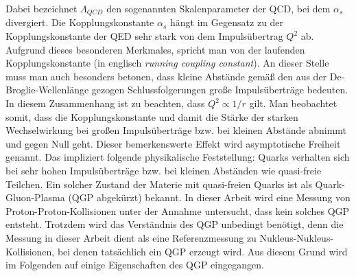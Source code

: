 \documentclass[12pt,a4paper]{report}
\begin{document}
Dabei bezeichnet $\Lambda_{QCD}$ den sogenannten Skalenparameter der QCD, bei dem $\alpha_{s}$ divergiert. Die Kopplungskonstante $\alpha_{s}$ hängt im Gegensatz zu der Kopplungskonstante der QED sehr stark von dem Impulsübertrag $Q^{2}$ ab. Aufgrund dieses besonderen Merkmales, spricht man von der laufenden Kopplungskonstante (in englisch \textit{running coupling constant}). An dieser Stelle muss man auch besonders betonen, dass kleine Abstände gemäß den aus der De-Broglie-Wellenlänge gezogen Schlussfolgerungen große Impulsüberträge bedeuten. In diesem Zusammenhang ist zu beachten, dass $Q^{2}\propto 1/r$ gilt. Man beobachtet somit, dass die Kopplungskonstante und damit die Stärke der starken Wechselwirkung bei großen Impulsüberträge bzw. bei kleinen Abstände abnimmt und gegen Null geht. Dieser bemerkenswerte Effekt wird asymptotische Freiheit genannt. Das impliziert folgende physikalische Feststellung: Quarks verhalten sich bei sehr hohen Impulsüberträge bzw. bei kleinen Abständen wie quasi-freie Teilchen. Ein solcher Zustand der Materie mit quasi-freien Quarks ist als Quark-Gluon-Plasma (QGP abgekürzt) bekannt. In dieser Arbeit wird eine Messung von Proton-Proton-Kollisionen unter der Annahme untersucht, dass kein solches QGP entsteht. Trotzdem wird das Verständnis des QGP unbedingt benötigt, denn die Messung in dieser Arbeit dient als eine Referenzmessung zu Nukleus-Nukleus-Kollisionen, bei denen tatsächlich ein QGP erzeugt wird. Aus diesem Grund wird im Folgenden auf einige Eigenschaften des QGP eingegangen.
\end{document}
